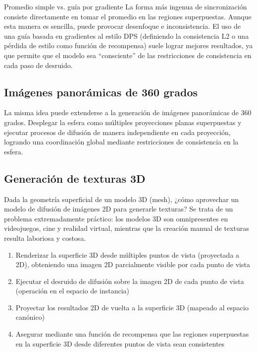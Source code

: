 \begin{warningbox}{Promedio simple vs. guía por gradiente}
La forma más ingenua de sincronización consiste directamente en tomar el promedio en las regiones superpuestas. Aunque esta manera es sencilla, puede provocar desenfoque e inconsistencia. El uso de una guía basada en gradientes al estilo DPS (definiendo la consistencia L2 o una pérdida de estilo como función de recompensa) suele lograr mejores resultados, ya que permite que el modelo sea ``consciente'' de las restricciones de consistencia en cada paso de desruido.
\end{warningbox}

\subsection{Imágenes panorámicas de 360 grados}

La misma idea puede extenderse a la generación de imágenes panorámicas de 360 grados. Desplegar la esfera como múltiples proyecciones planas superpuestas y ejecutar procesos de difusión de manera independiente en cada proyección, logrando una coordinación global mediante restricciones de consistencia en la esfera.

\subsection{Generación de texturas 3D}

Dada la geometría superficial de un modelo 3D (mesh), ¿cómo aprovechar un modelo de difusión de imágenes 2D para generarle texturas? Se trata de un problema extremadamente práctico: los modelos 3D son omnipresentes en videojuegos, cine y realidad virtual, mientras que la creación manual de texturas resulta laboriosa y costosa.

\begin{enumerate}
    \item Renderizar la superficie 3D desde múltiples puntos de vista (proyectada a 2D), obteniendo una imagen 2D parcialmente visible por cada punto de vista
    \item Ejecutar el desruido de difusión sobre la imagen 2D de cada punto de vista (operación en el espacio de instancia)
    \item Proyectar los resultados 2D de vuelta a la superficie 3D (mapeado al espacio canónico)
    \item Asegurar mediante una función de recompensa que las regiones superpuestas en la superficie 3D desde diferentes puntos de vista sean consistentes
\end{enumerate}

